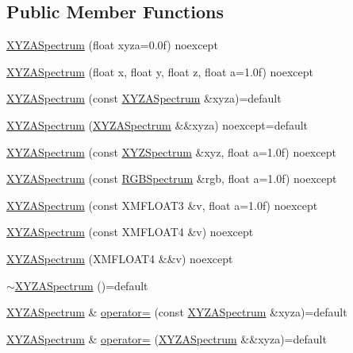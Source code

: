 \subsection*{Public Member Functions}
\begin{DoxyCompactItemize}
\item 
\hyperlink{structmage_1_1_x_y_z_a_spectrum_a121266a2b3f40eae8fe6c157086480f5}{X\+Y\+Z\+A\+Spectrum} (float xyza=0.\+0f) noexcept
\item 
\hyperlink{structmage_1_1_x_y_z_a_spectrum_ac50cc3275b859f08b5751f8485a3cf0d}{X\+Y\+Z\+A\+Spectrum} (float x, float y, float z, float a=1.\+0f) noexcept
\item 
\hyperlink{structmage_1_1_x_y_z_a_spectrum_a367d5f3c5c0cea681d3456dc7f41ad0f}{X\+Y\+Z\+A\+Spectrum} (const \hyperlink{structmage_1_1_x_y_z_a_spectrum}{X\+Y\+Z\+A\+Spectrum} \&xyza)=default
\item 
\hyperlink{structmage_1_1_x_y_z_a_spectrum_a08e4635f76feced3cabc8a8c7289f036}{X\+Y\+Z\+A\+Spectrum} (\hyperlink{structmage_1_1_x_y_z_a_spectrum}{X\+Y\+Z\+A\+Spectrum} \&\&xyza) noexcept=default
\item 
\hyperlink{structmage_1_1_x_y_z_a_spectrum_aab66eea2ff38bcaa907723e464ff18ef}{X\+Y\+Z\+A\+Spectrum} (const \hyperlink{structmage_1_1_x_y_z_spectrum}{X\+Y\+Z\+Spectrum} \&xyz, float a=1.\+0f) noexcept
\item 
\hyperlink{structmage_1_1_x_y_z_a_spectrum_a207f98d52c8198763217055776be241f}{X\+Y\+Z\+A\+Spectrum} (const \hyperlink{structmage_1_1_r_g_b_spectrum}{R\+G\+B\+Spectrum} \&rgb, float a=1.\+0f) noexcept
\item 
\hyperlink{structmage_1_1_x_y_z_a_spectrum_a74e2fd74cd70556f2a3eabbd316f1fd1}{X\+Y\+Z\+A\+Spectrum} (const X\+M\+F\+L\+O\+A\+T3 \&v, float a=1.\+0f) noexcept
\item 
\hyperlink{structmage_1_1_x_y_z_a_spectrum_a12e237f69939ca8b7ef30710a0520771}{X\+Y\+Z\+A\+Spectrum} (const X\+M\+F\+L\+O\+A\+T4 \&v) noexcept
\item 
\hyperlink{structmage_1_1_x_y_z_a_spectrum_a1f070e38017938a45880952a4df8c8d5}{X\+Y\+Z\+A\+Spectrum} (X\+M\+F\+L\+O\+A\+T4 \&\&v) noexcept
\item 
\hyperlink{structmage_1_1_x_y_z_a_spectrum_ac50d94c9756b6e8c1ff611dc37fbcfbf}{$\sim$\+X\+Y\+Z\+A\+Spectrum} ()=default
\item 
\hyperlink{structmage_1_1_x_y_z_a_spectrum}{X\+Y\+Z\+A\+Spectrum} \& \hyperlink{structmage_1_1_x_y_z_a_spectrum_a19cd04808e18b2791307195c54846988}{operator=} (const \hyperlink{structmage_1_1_x_y_z_a_spectrum}{X\+Y\+Z\+A\+Spectrum} \&xyza)=default
\item 
\hyperlink{structmage_1_1_x_y_z_a_spectrum}{X\+Y\+Z\+A\+Spectrum} \& \hyperlink{structmage_1_1_x_y_z_a_spectrum_a7afaa89a90d8444691b74c1f4b257aec}{operator=} (\hyperlink{structmage_1_1_x_y_z_a_spectrum}{X\+Y\+Z\+A\+Spectrum} \&\&xyza)=default
\end{DoxyCompactItemize}


